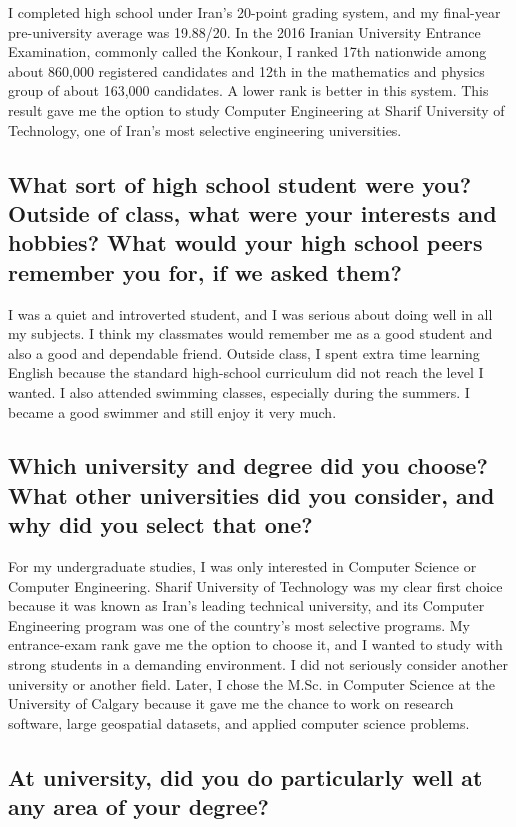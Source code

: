 \documentclass[11pt]{article}
\begin{document}
I completed high school under Iran's 20-point grading system, and my final-year pre-university average was 19.88/20. In the 2016 Iranian University Entrance Examination, commonly called the Konkour, I ranked 17th nationwide among about 860,000 registered candidates and 12th in the mathematics and physics group of about 163,000 candidates. A lower rank is better in this system. This result gave me the option to study Computer Engineering at Sharif University of Technology, one of Iran's most selective engineering universities.

\subsection*{What sort of high school student were you? Outside of class, what were your interests and hobbies? What would your high school peers remember you for, if we asked them?}

I was a quiet and introverted student, and I was serious about doing well in all my subjects. I think my classmates would remember me as a good student and also a good and dependable friend. Outside class, I spent extra time learning English because the standard high-school curriculum did not reach the level I wanted. I also attended swimming classes, especially during the summers. I became a good swimmer and still enjoy it very much.

\subsection*{Which university and degree did you choose? What other universities did you consider, and why did you select that one?}

For my undergraduate studies, I was only interested in Computer Science or Computer Engineering. Sharif University of Technology was my clear first choice because it was known as Iran's leading technical university, and its Computer Engineering program was one of the country's most selective programs. My entrance-exam rank gave me the option to choose it, and I wanted to study with strong students in a demanding environment. I did not seriously consider another university or another field. Later, I chose the M.Sc. in Computer Science at the University of Calgary because it gave me the chance to work on research software, large geospatial datasets, and applied computer science problems.

\subsection*{At university, did you do particularly well at any area of your degree?}
\end{document}
